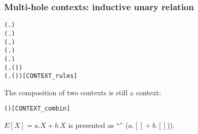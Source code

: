 \begin{frame}[fragile]
\frametitle{Multi-hole contexts: inductive unary relation}
\vspace{-2ex}
\begin{definition}
\begin{small}
\begin{alltt}
 (\HOLTokenLambda{}. )
 (\HOLTokenLambda{}. )
  \HOLSymConst{\HOLTokenImp{}}  (\HOLTokenLambda{}.  )
  \HOLSymConst{\HOLTokenConj{}}   \HOLSymConst{\HOLTokenImp{}}  (\HOLTokenLambda{}.   \HOLSymConst{\ensuremath{+}}  )
  \HOLSymConst{\HOLTokenConj{}}   \HOLSymConst{\HOLTokenImp{}}  (\HOLTokenLambda{}.   \HOLSymConst{\ensuremath{\parallel}}  )
  \HOLSymConst{\HOLTokenImp{}}  (\HOLTokenLambda{}. \HOLSymConst{\ensuremath{\nu}}  ( ))
  \HOLSymConst{\HOLTokenImp{}}  (\HOLTokenLambda{}.  ( ) )\hfill{[CONTEXT_rules]}
\end{alltt}
The composition of two contexts is still a context:
\vspace*{-10pt}
\begin{alltt}
\HOLTokenTurnstile{}   \HOLSymConst{\HOLTokenConj{}}   \HOLSymConst{\HOLTokenImp{}}  ( \HOLSymConst{\HOLTokenCompose} )\hfill{[CONTEXT_combin]}
\end{alltt}
\end{small}
\end{definition}
\begin{examples}
$E[X] = a.X + b.X$ is presented as ``'' ($a.[] + b.[]$)).
\end{examples}
\end{frame}

